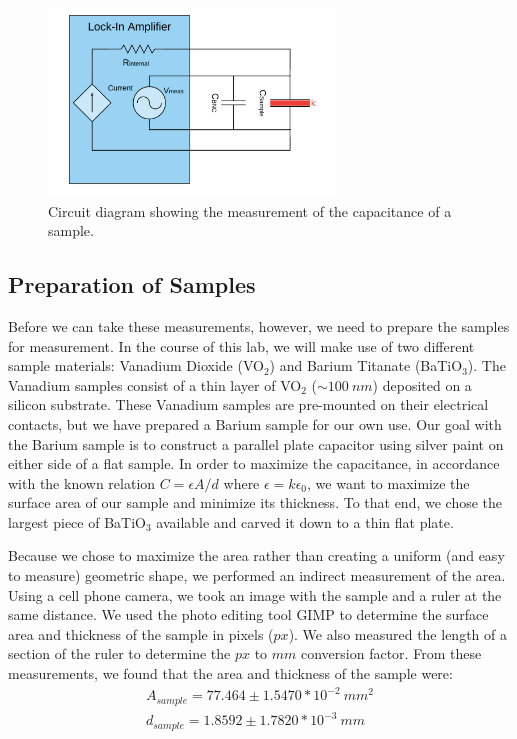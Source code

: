 \documentclass[%
 reprint,
 amsmath,amssymb,
 aps,
 pra,
]{revtex4-1}
\begin{document}
\begin{figure}[H]
	\centering
	\includegraphics[height=5cm]{diagram_cap.png}
	\caption{Circuit diagram showing the measurement of the capacitance of a sample.}
	\label{fig:CapMeasurements}
\end{figure}

\subsection{Preparation of Samples}

Before we can take these measurements, however, we need to prepare the samples for measurement. In the course of this lab, we will make use of two different sample materials: Vanadium Dioxide (VO$_2$) and Barium Titanate (BaTiO$_3$). The Vanadium samples consist of a thin layer of VO$_2$ ($\sim 100~nm$) deposited on a silicon substrate. These Vanadium samples are pre-mounted on their electrical contacts, but we have prepared a Barium sample for our own use. Our goal with the Barium sample is to construct a parallel plate capacitor using silver paint on either side of a flat sample. In order to maximize the capacitance, in accordance with the known relation $C = \epsilon A/d$ where $\epsilon = k \epsilon_0$, we want to maximize the surface area of our sample and minimize its thickness. To that end, we chose the largest piece of BaTiO$_3$ available and carved it down to a thin flat plate.

Because we chose to maximize the area rather than creating a uniform (and easy to measure) geometric shape, we performed an indirect measurement of the area. Using a cell phone camera, we took an image with the sample and a ruler at the same distance. We used the photo editing tool GIMP to determine the surface area and thickness of the sample in pixels ($px$). We also measured the length of a section of the ruler to determine the $px$ to $mm$ conversion factor. From these measurements, we found that the area and thickness of the sample were:
\begin{gather}
	A_{sample} = 77.464 \pm 1.5470*10^{-2} ~mm^2  \nonumber \\
	d_{sample} = 1.8592 \pm 1.7820*10^{-3} ~mm	 \nonumber
\end{gather}
\end{document}
